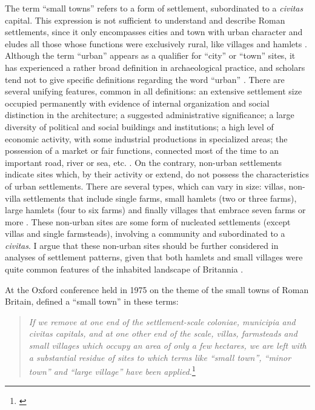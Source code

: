 The term “small towns” refers to a form of settlement, subordinated to a \textit{civitas} capital. This expression is not sufficient to understand and describe Roman settlements, since it only encompasses cities and town with urban character and eludes all those whose functions were exclusively rural, like villages and hamlets \parencites{Favory_2012}{Rivet_1975b}{Smith_1987}{Todd_1970}{Wacher_1995}. Although the term “urban” appears as a qualifier for “city” or “town” sites, it has experienced a rather broad definition in archaeological practice, and scholars tend not to give specific definitions regarding the word “urban” \parencite[29]{Renfrew_2008}. There are several unifying features, common in all definitions: an extensive settlement size occupied permanently with evidence of internal organization and social distinction in the architecture; a suggested administrative significance; a large diversity of political and social buildings and institutions; a high level of economic activity, with some industrial productions in specialized areas; the possession of a market or fair functions, connected most of the time to an important road, river or sea, etc. \parencite[29]{Renfrew_2008}. On the contrary, non-urban settlements indicate sites which, by their activity or extend, do not possess the characteristics of urban settlements. There are several types, which can vary in size: villas, non-villa settlements that include single farms, small hamlets (two or three farms), large hamlets (four to six farms) and finally villages that embrace seven farms or more \parencite[76]{Hingley_1989}. These non-urban sites are some form of nucleated settlements (except villas and single farmsteads), involving a community and subordinated to a \textit{civitas}. I argue that these non-urban sites should be further considered in analyses of settlement patterns, given that both hamlets and small villages were quite common features of the inhabited landscape of Britannia \parencites[cf.][]{Hingley_1989}{Hanley_2000}. 

At the Oxford conference held in 1975 on the theme of the small towns of Roman Britain, \textcite[1]{Rodwell_1975} defined a “small town” in these terms:

\blockquote{\textit{If we remove at one end of the settlement-scale coloniae, municipia and civitas capitals, and at one other end of the scale, villas, farmsteads and small villages which occupy an area of only a few hectares, we are left with a substantial residue of sites to which terms like “small town”, “minor town” and “large village” have been applied.}\footnote{\textcite[1]{Rodwell_1975}}}

